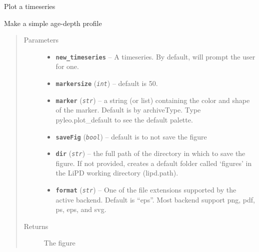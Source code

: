 \documentclass[letterpaper,10pt,english]{sphinxmanual}
\begin{document}
\begin{fulllineitems}
\label{TSPlots:pyleoclim.Plot}
Plot a timeseries

\begin{fulllineitems}
\label{TSPlots:pyleoclim.Plot.agemodelplot}
Make a simple age-depth profile
\begin{quote}\begin{description}
\item[{Parameters}] \leavevmode\begin{itemize}
\item {} 
\textbf{\texttt{new\_timeseries}} -- A timeseries. By default, will prompt the user for one.

\item {} 
\textbf{\texttt{markersize}} (\emph{\texttt{int}}) -- default is 50.

\item {} 
\textbf{\texttt{marker}} (\emph{\texttt{str}}) -- a string (or list) containing the color and shape of
the marker. Default is by archiveType. Type pyleo.plot\_default
to see the default palette.

\item {} 
\textbf{\texttt{saveFig}} (\emph{\texttt{bool}}) -- default is to not save the figure

\item {} 
\textbf{\texttt{dir}} (\emph{\texttt{str}}) -- the full path of the directory in which to save the figure.
If not provided, creates a default folder called `figures' in
the LiPD working directory (lipd.path).

\item {} 
\textbf{\texttt{format}} (\emph{\texttt{str}}) -- One of the file extensions supported by the active
backend. Default is ``eps''. Most backend support png, pdf, ps,
eps, and svg.

\end{itemize}

\item[{Returns}] \leavevmode
The figure

\end{description}\end{quote}


\end{fulllineitems}
\end{fulllineitems}
\end{document}
